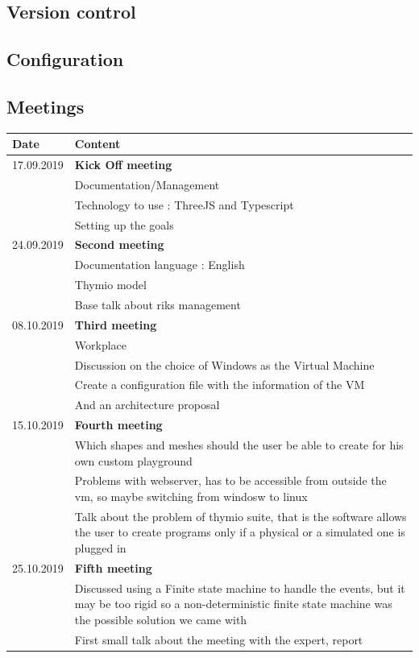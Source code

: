 \documentclass{scrartcl}
\begin{document}
\subsection{Version control}

\subsection{Configuration}

\subsection{Meetings}
\begin{tabular}{ | m{3cm} | m{10cm} | }
  \hline
  Date & Content \\
  \hline
  17.09.2019 & \textbf{Kick Off meeting}\\
  & Documentation/Management\\
  & Technology to use : ThreeJS and Typescript\\
  & Setting up the goals\\
  \hline
  24.09.2019 & \textbf{Second meeting} \\
  & Documentation language : English \\
  & Thymio model \\
  & Base talk about riks management \\
  \hline
  08.10.2019 & \textbf{Third meeting}\\
  & Workplace\\
  & Discussion on the choice of Windows as the Virtual Machine \\
  & Create a configuration file with the information of the VM \\
  & And an architecture proposal \\
  \hline
  15.10.2019 & \textbf{Fourth meeting} \\
  & Which shapes and meshes should the user be able to create for his own custom playground \\
  & Problems with webserver, has to be accessible from outside the vm, so maybe switching from windosw to linux \\
  & Talk about the problem of thymio suite, that is the software allows the user to create programs only if a physical or a simulated one is plugged in \\
  \hline
  25.10.2019 & \textbf{Fifth meeting} \\
  & Discussed using a Finite state machine to handle the events, but it may be too rigid so a non-deterministic finite state machine was the possible solution we came with \\
  & First small talk about the meeting with the expert, report\\
  \hline
\end{tabular}
\end{document}
